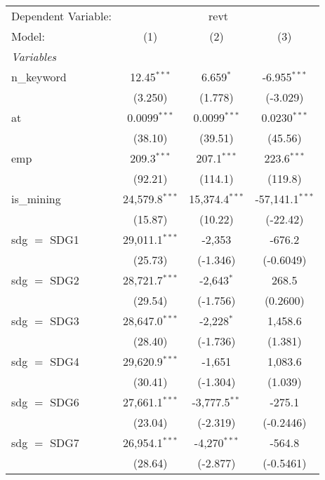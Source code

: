 
\begingroup
\centering
\begin{tabular}{lccc}
   \tabularnewline \midrule \midrule
   Dependent Variable: & \multicolumn{3}{c}{revt}\\
   Model:        & (1)              & (2)              & (3)\\  
   \midrule
   \emph{Variables}\\
   n\_keyword    & 12.45$^{***}$    & 6.659$^{*}$      & -6.955$^{***}$\\   
                 & (3.250)          & (1.778)          & (-3.029)\\   
   at            & 0.0099$^{***}$   & 0.0099$^{***}$   & 0.0230$^{***}$\\   
                 & (38.10)          & (39.51)          & (45.56)\\   
   emp           & 209.3$^{***}$    & 207.1$^{***}$    & 223.6$^{***}$\\   
                 & (92.21)          & (114.1)          & (119.8)\\   
   is\_mining    & 24,579.8$^{***}$ & 15,374.4$^{***}$ & -57,141.1$^{***}$\\   
                 & (15.87)          & (10.22)          & (-22.42)\\   
   sdg $=$ SDG1  & 29,011.1$^{***}$ & -2,353           & -676.2\\   
                 & (25.73)          & (-1.346)         & (-0.6049)\\   
   sdg $=$ SDG2  & 28,721.7$^{***}$ & -2,643$^{*}$     & 268.5\\   
                 & (29.54)          & (-1.756)         & (0.2600)\\   
   sdg $=$ SDG3  & 28,647.0$^{***}$ & -2,228$^{*}$     & 1,458.6\\   
                 & (28.40)          & (-1.736)         & (1.381)\\   
   sdg $=$ SDG4  & 29,620.9$^{***}$ & -1,651           & 1,083.6\\   
                 & (30.41)          & (-1.304)         & (1.039)\\   
   sdg $=$ SDG6  & 27,661.1$^{***}$ & -3,777.5$^{**}$  & -275.1\\   
                 & (23.04)          & (-2.319)         & (-0.2446)\\   
   sdg $=$ SDG7  & 26,954.1$^{***}$ & -4,270$^{***}$   & -564.8\\   
                 & (28.64)          & (-2.877)         & (-0.5461)\\   

\end{tabular}
